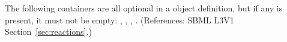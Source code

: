 The following containers are all optional in a \Reaction object definition,
but if any is present, it must not be empty: \ListOfReactants,
\ListOfProducts, \ListOfModifiers, \KineticLaw.  (References: SBML L3V1
Section~\ref{sec:reactions}.)
